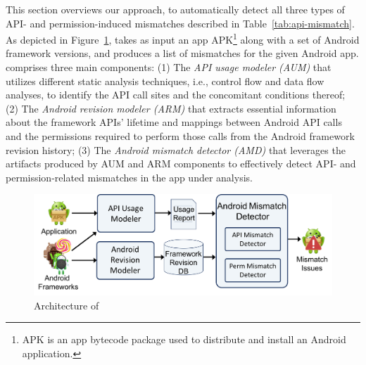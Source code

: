 
This section overviews our approach, 
to automatically detect all three types
of API- and permission-induced mismatches described in
Table~\ref{tab:api-mismatch}. As depicted in
Figure~\ref{fig:arch}, \@approach takes as input an app
APK\footnote{APK is an app bytecode package used to
distribute and install an Android application.} along
with a set of Android framework versions, and produces
a list of mismatches for the given Android app.  
\@approach comprises three main components:
(1) The \textit{API usage modeler (AUM)} that utilizes
different static analysis techniques, i.e., control
flow and data flow analyses, to  identify the API call
sites and the concomitant conditions thereof; 
(2) The \textit{Android revision modeler (ARM)} that
extracts essential information about the framework
APIs' lifetime and mappings between Android API calls
and the permissions required to perform those calls
from the Android framework revision history;
(3) The \textit{Android mismatch detector (AMD)} that
leverages the artifacts produced by AUM and ARM
components to effectively detect API- and
permission-related mismatches in the app under
analysis.

 

\begin{figure}[t!]
    \centering
    \includegraphics[width=\linewidth]{images/Approach.png}
    \caption{Architecture of \@approach}
    \label{fig:arch}
\end{figure}

